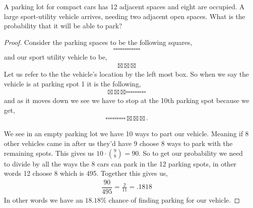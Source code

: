 \documentclass[11pt]{article}
\newenvironment{problem}[2][Problem\!]{\begin{trivlist}
\item[\hskip \labelsep {\bfseries #1}\hskip \labelsep {\bfseries #2}]}{\end{trivlist}}
\begin{document}
\newpage
\begin{tcolorbox}
    \begin{problem} {OC | 11/01 | 69.}
        A parking lot for compact cars has 12 adjacent spaces and eight are occupied. A large sport-utility vehicle arrives, needing two adjacent open spaces. What is the probability that it will be able to park?
    \end{problem}
\end{tcolorbox}
\begin{proof}
    Consider the parking spaces to be the following squares, 
    \begin{align*}
        \square \square \square \square \square \square \square \square \square \square \square \square
    \end{align*}
    and our sport utility vehicle to be,
    \begin{align*}
        \boxtimes \boxtimes \boxtimes 
    \end{align*}
    Let us refer to the the vehicle's location by the left most box. So when we say the vehicle is at parking spot 1 it is the following,
    \begin{align*}
        \boxtimes \boxtimes \boxtimes \square \square \square \square \square \square \square \square \square
    \end{align*}
    and as it moves down we see we have to stop at the 10th parking spot because we get,
    \begin{align*}
        \square \square \square \square \square \square \square \square \square \boxtimes \boxtimes \boxtimes.
    \end{align*}

    We see in an empty parking lot we have 10 ways to part our vehicle. Meaning if 8 other vehicles came in after us they'd have 9 choose 8 ways to park with the remaining spots. This gives us $10 \cdot \binom{9}{8} = 90 $. So to get our probability we need to divide by all the ways the 8 cars can park in the 12 parking spots, in other words 12 choose 8 which is 495. Together this gives us,
    \begin{align*}
        \dfrac{90}{495} = \frac{2}{11} = .1818
    \end{align*}
    In other words we have an $18.18\%$ chance of finding parking for our vehicle. 
\end{proof}
\end{document}
